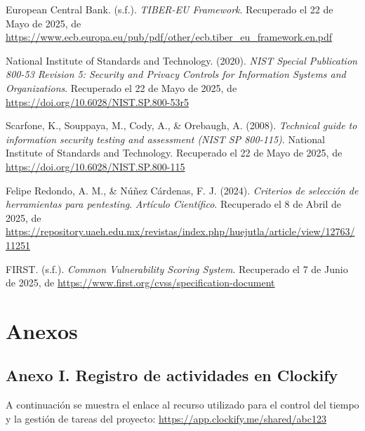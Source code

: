 \documentclass[a4paper, 11pt]{article}
\begin{document}
\begin{thebibliography}{99}
    European Central Bank. (s.f.). \textit{TIBER-EU Framework}. Recuperado el 22 de Mayo de 2025, de \url{https://www.ecb.europa.eu/pub/pdf/other/ecb.tiber_eu_framework.en.pdf}

    National Institute of Standards and Technology. (2020). \textit{NIST Special Publication 800-53 Revision 5: Security and Privacy Controls for Information Systems and Organizations}. Recuperado el 22 de Mayo de 2025, de \url{https://doi.org/10.6028/NIST.SP.800-53r5}

    Scarfone, K., Souppaya, M., Cody, A., \& Orebaugh, A. (2008). \textit{Technical guide to information security testing and assessment (NIST SP 800-115)}. National Institute of Standards and Technology. Recuperado el 22 de Mayo de 2025, de \url{https://doi.org/10.6028/NIST.SP.800-115}

    Felipe Redondo, A. M., \& Núñez Cárdenas, F. J. (2024). \textit{Criterios de selección de herramientas para pentesting}. \textit{Artículo Científico}. Recuperado el 8 de Abril de 2025, de \url{https://repository.uaeh.edu.mx/revistas/index.php/huejutla/article/view/12763/11251}

    FIRST. (s.f.). \textit{Common Vulnerability Scoring System}. Recuperado el 7 de Junio de 2025, de \url{https://www.first.org/cvss/specification-document}

\end{thebibliography}


\clearpage







\section{Anexos}


\subsection{Anexo I. Registro de actividades en Clockify}

A continuación se muestra el enlace al recurso utilizado para el control del tiempo y la gestión de tareas del proyecto:
\url{https://app.clockify.me/shared/abc123}


\clearpage
\end{document}
